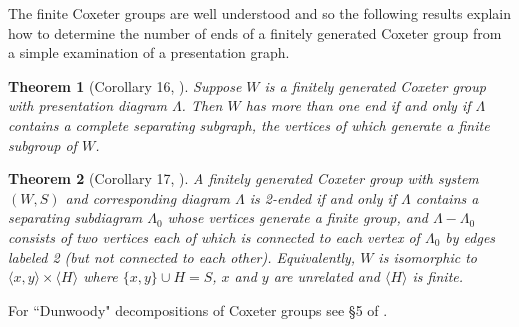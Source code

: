 \documentclass[12pt]{article}
\newtheorem{theorem}{Theorem}[subsection]
\begin{document}
The finite Coxeter groups are well understood and so the following results explain how to determine the number of ends of a finitely generated Coxeter group from a simple examination of a presentation graph. 

\begin{theorem} [Corollary 16, \cite{MT09}] \label{CoxE}   Suppose $W$ is  a finitely generated Coxeter group with presentation diagram $\Lambda$. Then $W$ has more than one end if and only if $\Lambda$ contains a complete separating subgraph, the vertices of which generate a finite subgroup of $W$.
\end{theorem}

\begin{theorem} [Corollary 17, \cite{MT09}] \label{Cox2E}  A finitely generated Coxeter group with system $(W,S)$ and corresponding diagram $\Lambda$ is 2-ended if and only if $\Lambda$ contains a separating subdiagram $\Lambda_0$ whose vertices generate a finite group, and $\Lambda-\Lambda_0$ consists of two vertices each of which is connected to each vertex of $\Lambda_0$ by edges labeled 2 (but not connected to each other). Equivalently, $W$ is isomorphic to $\langle x,y\rangle\times \langle H\rangle$ where $\{x,y\}\cup H=S$, $x$ and $y$ are unrelated and $\langle H\rangle$ is finite. 
\end{theorem}

For ``Dunwoody" decompositions of Coxeter groups see \S 5 of \cite{MT09}.
\end{document}
